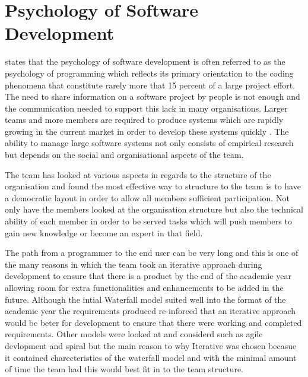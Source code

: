 \section{Psychology of Software Development}
\label{sec:psychology_of_software_development}

\citet{progpro86} states that the psychology of software development is often referred to as the psychology of programming which reflects its primary orientation to the coding phenomena that constitute rarely more that 15 percent of a large project effort. The need to share information on a software project by people is not enough and the communication needed to support this lack in many organisations. Larger teams and more members are required to produce systems which are rapidly growing in the current market in order to develop these systems quickly \citep{see81}. The ability to manage large software systems not only consists of empirical research but depends on the social and organisational aspects of the team. 

The team has looked at various aspects in regards to the structure of the organisation and found the most effective way to structure to the team is to have a democratic layout in order to allow all members sufficient participation. Not only have the members looked at the organisation structure but also the technical ability of each member in order to be served tasks which will push members to gain new knowledge or become an expert in that field. 

The path from a programmer to the end user can be very long and this is one of the many reasons in which the team took an iterative approach during development to ensure that there is a product by the end of the academic year allowing room for extra functionalities and enhancements to be added in the future. Although the intial Waterfall model suited well into the format of the academic year the requirements produced re-inforced that an iterative approach would be beter for development to ensure that there were working and completed requirements. Other models were looked at and considerd such as agile devlopment and spiral but the main reason to why Iterative was chosen becasue it contained charecteristics of the waterfall model and with the minimal amount of time the team had this would best fit in to the team structure.